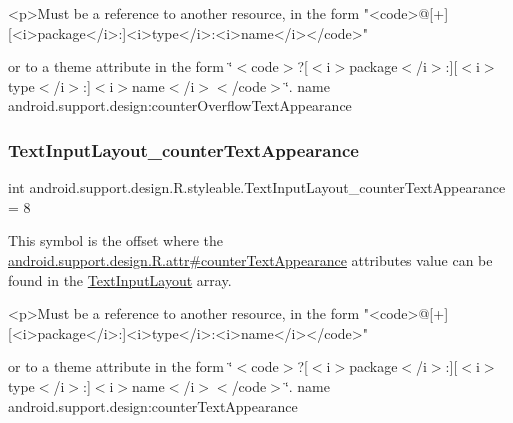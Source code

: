 \begin{DoxyVerb}      <p>Must be a reference to another resource, in the form "<code>@[+][<i>package</i>:]<i>type</i>:<i>name</i></code>"
\end{DoxyVerb}
 or to a theme attribute in the form \char`\"{}$<$code$>$?\mbox{[}$<$i$>$package$<$/i$>$\+:\mbox{]}\mbox{[}$<$i$>$type$<$/i$>$\+:\mbox{]}$<$i$>$name$<$/i$>$$<$/code$>$\char`\"{}.  name android.\+support.\+design\+:counter\+Overflow\+Text\+Appearance \mbox{\label{classandroid_1_1support_1_1design_1_1R_1_1styleable_ad31b5989bc5b2edce56f3e8277c50502}} 
\subsubsection{\texorpdfstring{Text\+Input\+Layout\+\_\+counter\+Text\+Appearance}{TextInputLayout\_counterTextAppearance}}
{\footnotesize\ttfamily int android.\+support.\+design.\+R.\+styleable.\+Text\+Input\+Layout\+\_\+counter\+Text\+Appearance = 8\hspace{0.3cm}{\ttfamily [static]}}

This symbol is the offset where the \hyperlink{classandroid_1_1support_1_1design_1_1R_1_1attr_a5d6d057b4e0916f2956a030fc7245a8e}{android.\+support.\+design.\+R.\+attr\#counter\+Text\+Appearance} attribute\textquotesingle{}s value can be found in the \hyperlink{classandroid_1_1support_1_1design_1_1R_1_1styleable_ae01fd2fce65dc8639f3898586b0cedcf}{Text\+Input\+Layout} array.

\begin{DoxyVerb}      <p>Must be a reference to another resource, in the form "<code>@[+][<i>package</i>:]<i>type</i>:<i>name</i></code>"
\end{DoxyVerb}
 or to a theme attribute in the form \char`\"{}$<$code$>$?\mbox{[}$<$i$>$package$<$/i$>$\+:\mbox{]}\mbox{[}$<$i$>$type$<$/i$>$\+:\mbox{]}$<$i$>$name$<$/i$>$$<$/code$>$\char`\"{}.  name android.\+support.\+design\+:counter\+Text\+Appearance \mbox{\label{classandroid_1_1support_1_1design_1_1R_1_1styleable_af41f85d64b3b697a4733e3d4aa3d0f38}} 
